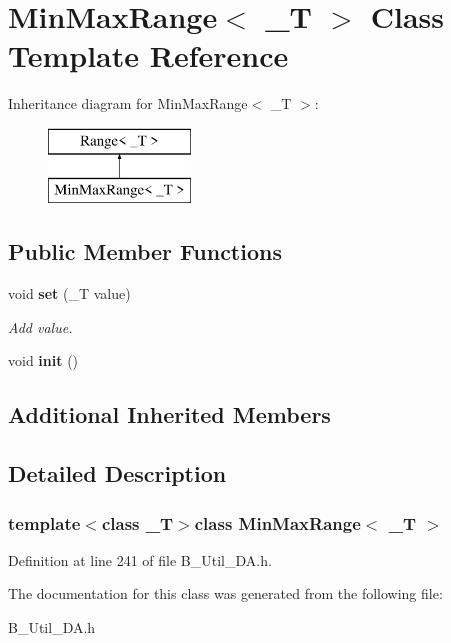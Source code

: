 \section{Min\-Max\-Range$<$ \-\_\-\-T $>$ Class Template Reference}
\label{classMinMaxRange}
Inheritance diagram for Min\-Max\-Range$<$ \-\_\-\-T $>$\-:\begin{figure}[H]
\begin{center}
\leavevmode
\includegraphics[height=2.000000cm]{classMinMaxRange}
\end{center}
\end{figure}
\subsection*{Public Member Functions}
\begin{DoxyCompactItemize}
\item 
void {\bf set} (\-\_\-\-T value)\label{classMinMaxRange_a16b7b6c4aaf960f65df1f168e9b43e06}

\begin{DoxyCompactList}\small\item\em Add value. \end{DoxyCompactList}\item 
void {\bfseries init} ()\label{classMinMaxRange_a62a97ff19a090c75c97945983bc56e7a}

\end{DoxyCompactItemize}
\subsection*{Additional Inherited Members}


\subsection{Detailed Description}
\subsubsection*{template$<$class \-\_\-\-T$>$class Min\-Max\-Range$<$ \-\_\-\-T $>$}



Definition at line 241 of file B\-\_\-\-Util\-\_\-\-D\-A.\-h.



The documentation for this class was generated from the following file\-:\begin{DoxyCompactItemize}
\item 
B\-\_\-\-Util\-\_\-\-D\-A.\-h\end{DoxyCompactItemize}
